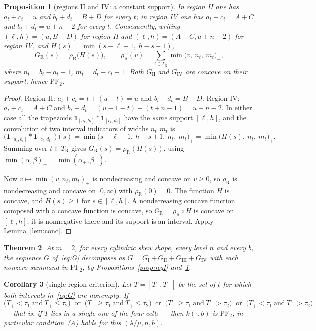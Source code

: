 \documentclass[11pt]{article}
\theoremstyle{plain}
\newtheorem{theorem}{Theorem}[section]
\newtheorem{proposition}[theorem]{Proposition}
\newtheorem{corollary}[theorem]{Corollary}
\theoremstyle{definition}
\newcommand{\PFtwo}{\mathrm{PF}_2}
\begin{document}
\begin{proposition}[regions II and IV: a constant support]\label{prop:regII}
In region II one has $a_t+c_t=u$ and $b_t+d_t=B+D$ for every $t$; in region IV one has
$a_t+c_t=A+C$ and $b_t+d_t=u+n-2$ for every $t$. Consequently, writing
$(\ell,h)=(u,B+D)$ for region II and $(\ell,h)=(A+C,u+n-2)$ for region IV, and
$H(s)=\min(s-\ell+1,\ h-s+1)$,
\[
  G_{\mathrm R}(s)=\rho_{\mathrm R}\bigl(H(s)\bigr),\qquad
  \rho_{\mathrm R}(v)=\sum_{t\in T_{\mathrm R}}\min\bigl(v,\ n_t,\ m_t\bigr)_+ ,
\]
where $n_t=b_t-a_t+1$, $m_t=d_t-c_t+1$. Both $G_{\mathrm{II}}$ and $G_{\mathrm{IV}}$ are
\emph{concave} on their support, hence $\PFtwo$.
\end{proposition}
\begin{proof}
Region II: $a_t+c_t=t+(u-t)=u$ and $b_t+d_t=B+D$. Region IV:
$a_t+c_t=A+C$ and $b_t+d_t=(u-1-t)+(t+n-1)=u+n-2$. In either case all the trapezoids
$\mathbf 1_{[a_t,b_t]}*\mathbf 1_{[c_t,d_t]}$ have the \emph{same} support $[\ell,h]$, and
the convolution of two interval indicators of widths $n_t,m_t$ is
\[
 \bigl(\mathbf 1_{[a_t,b_t]}*\mathbf 1_{[c_t,d_t]}\bigr)(s)
 =\min\bigl(s-\ell+1,\ h-s+1,\ n_t,\ m_t\bigr)_+
 =\min\bigl(H(s),\ n_t,\ m_t\bigr)_+ .
\]
Summing over $t\in T_{\mathrm R}$ gives $G_{\mathrm R}(s)=\rho_{\mathrm R}(H(s))$, using
$\min(\alpha,\beta)_+=\min(\alpha_+,\beta_+)$.

Now $v\mapsto\min(v,n_t,m_t)_+$ is nondecreasing and concave on $v\ge0$, so
$\rho_{\mathrm R}$ is nondecreasing and concave on $[0,\infty)$ with $\rho_{\mathrm R}(0)=0$.
The function $H$ is concave, and $H(s)\ge1$ for $s\in[\ell,h]$. A nondecreasing concave
function composed with a concave function is concave, so $G_{\mathrm R}=\rho_{\mathrm R}\circ H$
is concave on $[\ell,h]$; it is nonnegative there and its support is an interval. Apply
Lemma~\ref{lem:conc}.
\end{proof}

\begin{theorem}\label{thm:regions}
At $m=2$, for every cylindric skew shape, every level $n$ and every $b$, the sequence
$G$ of~\eqref{eq:G} decomposes as
$G=G_{\mathrm I}+G_{\mathrm{II}}+G_{\mathrm{III}}+G_{\mathrm{IV}}$ with each nonzero
summand in $\PFtwo$, by Propositions~\ref{prop:regI} and~\ref{prop:regII}.
\end{theorem}

\begin{corollary}[single-region criterion]\label{cor:single}
Let $T=[T_-,T_+]$ be the set of $t$ for which both intervals in~\eqref{eq:G} are nonempty.
If
\[
 \bigl(T_+<\tau_1\ \text{and}\ T_+\le\tau_2\bigr)\ \text{ or }\
 \bigl(T_-\ge\tau_1\ \text{and}\ T_+\le\tau_2\bigr)\ \text{ or }\
 \bigl(T_-\ge\tau_1\ \text{and}\ T_->\tau_2\bigr)\ \text{ or }\
 \bigl(T_+<\tau_1\ \text{and}\ T_->\tau_2\bigr)
\]
--- that is, if $T$ lies in a single one of the four cells --- then $k(\cdot,b)$ is $\PFtwo$;
in particular condition~(A) holds for this $(\lambda/\mu,n,b)$.
\end{corollary}
\end{document}
